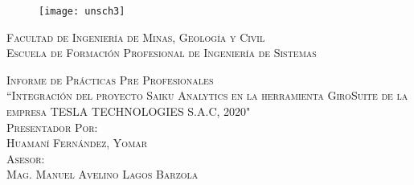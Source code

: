 \newcommand{\mydate}{\formatdate{02}{12}{2020}}
\begin{titlepage}
	\begin{center}
		
	
		\begin{figure}[h]
			\centering
			\texttt{[image: unsch3]}
		\end{figure}
		
		\textsc{ 
			\Large %
			\vspace{5mm}
			Facultad de Ingeniería de Minas, Geología y Civil\\
			\vspace{5mm}
			Escuela de Formación Profesional de Ingeniería de Sistemas\\}
		
		\textsc{ 
			\large Informe de Prácticas Pre Profesionales\\
			\vspace{5mm}
				``Integración del proyecto Saiku Analytics en la herramienta GiroSuite de la empresa TESLA TECHNOLOGIES S.A.C, 2020"\\
			\vspace{1cm}
			Presentador Por:\\
			Huamaní Fernández, Yomar\\	
			\vspace{5mm}
			Asesor:\\
			Mag. Manuel Avelino Lagos Barzola\\
			\vspace{5mm}
			\mydate
		}
	\end{center}
\end{titlepage}
